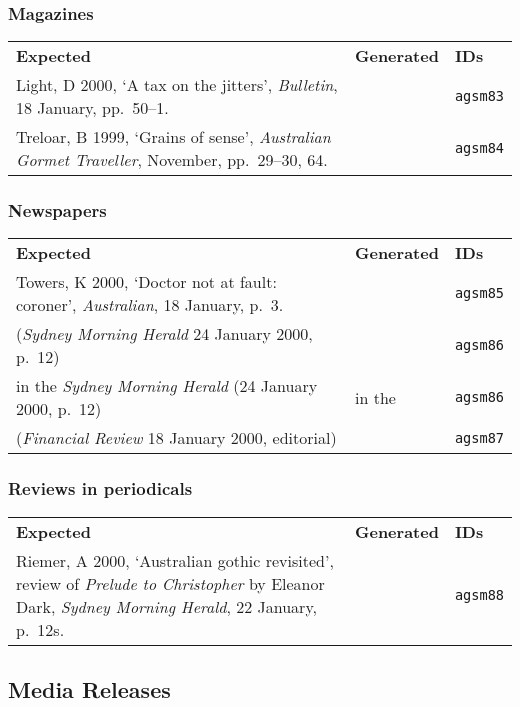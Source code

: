 \documentclass[a4paper,landscape,12pt]{article}
\newlength\q
\newlength\qr
\newenvironment{citetable}
  {\noindent\begin{longtable}{p{\q} p{\q} p{\qr}}\textbf{Expected} & \textbf{Generated} & \textbf{IDs}\\}
  {\end{longtable}}
\newcommand{\majorissue}[1]{\textcolor{red}{#1}}
\begin{document}
\subsubsection{Magazines}

\begin{citetable}
	Light, D 2000, `A tax on the jitters', \textit{Bulletin}, 18 January, pp.~50--1. & \fullcite{agsm83} & \texttt{agsm83} \\
	Treloar, B 1999, `Grains of sense', \textit{Australian Gormet Traveller}, November, pp.~29--30, 64. & \fullcite{agsm84} & \texttt{agsm84} \\
\end{citetable}

\subsubsection{Newspapers}

\begin{citetable}
	Towers, K 2000, `Doctor not at fault: coroner', \textit{Australian}, 18 January, p.~3. & \fullcite{agsm85} & \texttt{agsm85} \\
	(\textit{Sydney Morning Herald} 24 January 2000, p.~12) & \majorissue{\parencite{agsm86}} & \texttt{agsm86} \\
	\textellipsis{} in the \textit{Sydney Morning Herald} (24 January 2000, p.~12) & \textellipsis{} in the \majorissue{\textcite{agsm86}} & \texttt{agsm86} \\
	(\textit{Financial Review} 18 January 2000, editorial) & \majorissue{\parencite{agsm87}} & \texttt{agsm87} \\
\end{citetable}

\subsubsection{Reviews in periodicals}

\begin{citetable}
	Riemer, A 2000, `Australian gothic revisited', review of \textit{Prelude to Christopher} by Eleanor Dark, \textit{Sydney Morning Herald}, 22 January, p.~12s. & \majorissue{\fullcite{agsm88}} & \texttt{agsm88} \\
\end{citetable}

\subsection{Media Releases}
\end{document}
